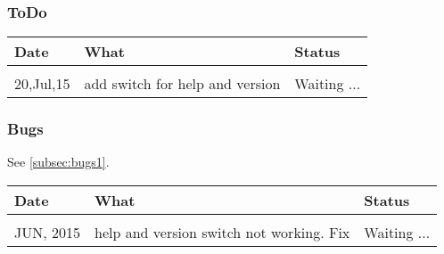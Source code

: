 \subsubsection{ToDo}
\begin{tabular}{l l l}
Date & What & Status\\
\hline \\
20,Jul,15  & add switch for help and version & Waiting ...\\
\end{tabular}

\subsubsection{Bugs}
See \autoref{subsec:bugs1}.
\bigskip

\begin{tabular}{l l l}
Date & What & Status\\
\hline \\
JUN, 2015 & help and version switch not working. Fix & Waiting ...\\
\end{tabular}